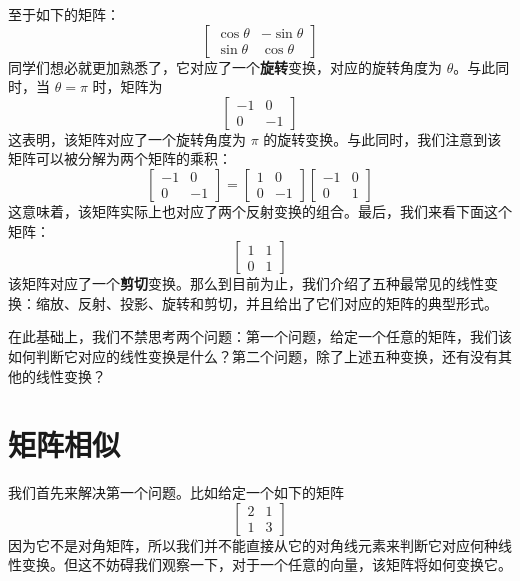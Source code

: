 \documentclass[cn]{simplepaper}
\begin{document}
至于如下的矩阵：
\[
    \begin{bmatrix}
        \cos \theta & -\sin \theta \\
        \sin \theta & \cos \theta
    \end{bmatrix}
\]
同学们想必就更加熟悉了，它对应了一个\textbf{旋转}变换，对应的旋转角度为 \( \theta \)。与此同时，当 \( \theta = \pi \) 时，矩阵为
\[
    \begin{bmatrix}
        -1 & 0   \\
        0  & -1
    \end{bmatrix}
\]
这表明，该矩阵对应了一个旋转角度为 \( \pi \) 的旋转变换。与此同时，我们注意到该矩阵可以被分解为两个矩阵的乘积：
\[
    \begin{bmatrix}
        -1 & 0   \\
        0  & -1
    \end{bmatrix} = \begin{bmatrix}
        1 & 0   \\
        0 & -1
    \end{bmatrix}
    \begin{bmatrix}
        -1 & 0  \\
        0  & 1
    \end{bmatrix}
\]
这意味着，该矩阵实际上也对应了两个反射变换的组合。最后，我们来看下面这个矩阵：
\[
    \begin{bmatrix}
        1 & 1  \\
        0 & 1
    \end{bmatrix}
\]
该矩阵对应了一个\textbf{剪切}变换。那么到目前为止，我们介绍了五种最常见的线性变换：缩放、反射、投影、旋转和剪切，并且给出了它们对应的矩阵的典型形式。

在此基础上，我们不禁思考两个问题：第一个问题，给定一个任意的矩阵，我们该如何判断它对应的线性变换是什么？第二个问题，除了上述五种变换，还有没有其他的线性变换？

\section{矩阵相似}

我们首先来解决第一个问题。比如给定一个如下的矩阵
\[
    \begin{bmatrix}
        2 & 1  \\
        1 & 3
    \end{bmatrix}
\]
因为它不是对角矩阵，所以我们并不能直接从它的对角线元素来判断它对应何种线性变换。但这不妨碍我们观察一下，对于一个任意的向量，该矩阵将如何变换它。

\printbibliography[heading=simplepaper]
\end{document}

